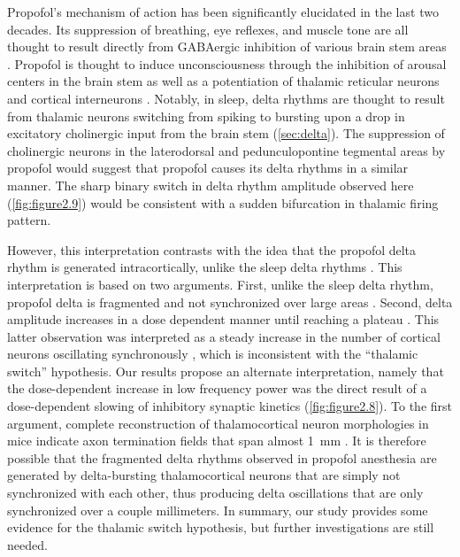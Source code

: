 Propofol's mechanism of action has been significantly elucidated in the last two decades. Its suppression of breathing, eye reflexes, and muscle tone are all thought to result directly from GABAergic inhibition of various brain stem areas \cite{Brown2011}. Propofol is thought to induce unconsciousness through the inhibition of arousal centers in the brain stem as well as a potentiation of thalamic reticular neurons and cortical interneurons \cite{Brown2011}. Notably, in sleep, delta rhythms are thought to result from thalamic neurons switching from spiking to bursting upon a drop in excitatory cholinergic input from the brain stem (\autoref{sec:delta}). The suppression of cholinergic neurons in the laterodorsal and pedunculopontine tegmental areas by propofol \cite{Brown2011} would suggest that propofol causes its delta rhythms in a similar manner. The sharp binary switch in delta rhythm amplitude observed here (\autoref{fig:figure2.9}) would be consistent with a sudden bifurcation in thalamic firing pattern. 

However, this interpretation contrasts with the idea that the propofol delta rhythm is generated intracortically, unlike the sleep delta rhythms \cite{Akeju2017d}. This interpretation is based on two arguments. First, unlike the sleep delta rhythm, propofol delta is fragmented and not synchronized over large areas \cite{Akeju2017d,Lewis2012}. Second, delta amplitude increases in a dose dependent manner until reaching a plateau \cite{Akeju2017d,NiMhuircheartaigh2013}. This latter observation was interpreted as a steady increase in the number of cortical neurons oscillating synchronously \cite{NiMhuircheartaigh2013}, which is inconsistent with the ``thalamic switch'' hypothesis. Our results propose an alternate interpretation, namely that the dose-dependent increase in low frequency power was the direct result of a dose-dependent slowing of inhibitory synaptic kinetics (\autoref{fig:figure2.8}). To the first argument, complete reconstruction of thalamocortical neuron morphologies in mice indicate axon termination fields that span almost \qty{1}{\milli\meter} \cite{Winnubst2019}. It is therefore possible that the fragmented delta rhythms observed in propofol anesthesia are generated by delta-bursting thalamocortical neurons that are simply not synchronized with each other, thus producing delta oscillations that are only synchronized over a couple millimeters. In summary, our study provides some evidence for the thalamic switch hypothesis, but further investigations are still needed.

